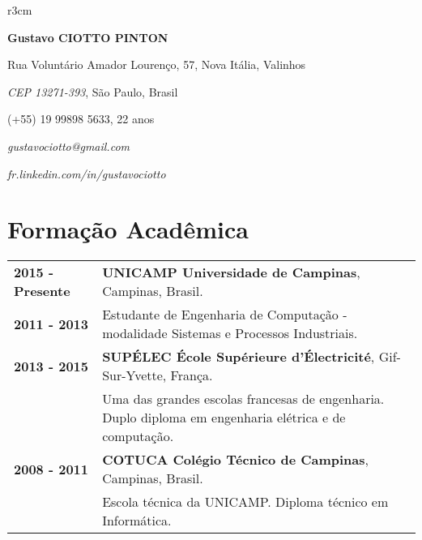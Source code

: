 \documentclass[10pt, a4paper]{article}
\author{Gustavo Ciotto Pinton}
\begin{document}
\pagestyle{empty} 

\begin{wrapfigure}{r}{3cm}
  \vspace{-20pt}
  \begin{center}
  \end{center}
\end{wrapfigure}

\textbf{\LARGE Gustavo CIOTTO PINTON}

Rua Voluntário Amador Lourenço, 57, Nova Itália, Valinhos

\textit{CEP 13271-393}, São Paulo, Brasil

(+55) 19 99898 5633, 22 anos

\textit{gustavociotto@gmail.com} 

\textit{fr.linkedin.com/in/gustavociotto}



\section{Formação Acadêmica}

\begin{tabular}{p{} p{}}

 \textbf{2015 - Presente} & \textbf{UNICAMP Universidade de Campinas}, Campinas,
 Brasil.
 \\
 \textbf{2011 - 2013} & Estudante de Engenharia de Computação - modalidade
 Sistemas e Processos Industriais. \vspace{8pt}\\

 \textbf{2013 - 2015} & \textbf{SUPÉLEC  École Supérieure d'Électricité},
 Gif-Sur-Yvette, França. \\
 & Uma das grandes escolas francesas de engenharia. Duplo diploma em
 engenharia elétrica e de computação. \vspace{8pt}
 \\
  
 
 \textbf{2008 - 2011} & \textbf{COTUCA Colégio Técnico de Campinas}, Campinas,
 Brasil. \\
 & Escola técnica da UNICAMP. Diploma técnico em Informática. \\
\end{tabular}
\end{document}
